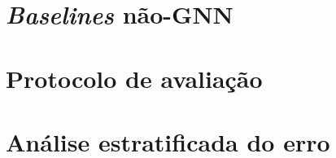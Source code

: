 
\section{\emph{Baselines} n\~ao-GNN}
\label{sec:baselines}

%

\section{Protocolo de avalia\c{c}\~ao}
\label{sec:protocolo}

%

\section{An\'alise estratificada do erro}
\label{sec:metod_estratificacao}

%
%

